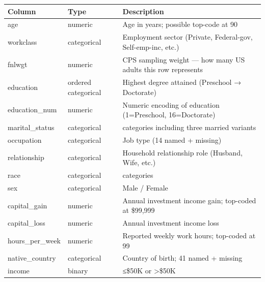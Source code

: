 \documentclass[
  letterpaper,
  DIV=11,
  numbers=noendperiod]{scrartcl}
\begin{document}
\begin{longtable}[]{@{}
  >{\raggedright\arraybackslash}p{}
  >{\raggedright\arraybackslash}p{}
  >{\raggedright\arraybackslash}p{}@{}}
\toprule\noalign{}
\begin{minipage}[b]{\linewidth}\raggedright
Column
\end{minipage} & \begin{minipage}[b]{\linewidth}\raggedright
Type
\end{minipage} & \begin{minipage}[b]{\linewidth}\raggedright
Description
\end{minipage} \\
\midrule\noalign{}
\endhead
\bottomrule\noalign{}
\endlastfoot
age & numeric & Age in years; possible top-code at 90 \\
workclass & categorical & Employment sector (Private, Federal-gov,
Self-emp-inc, etc.) \\
fnlwgt & numeric & CPS sampling weight --- how many US adults this row
represents \\
education & ordered categorical & Highest degree attained (Preschool →
Doctorate) \\
education\_num & numeric & Numeric encoding of education (1=Preschool,
16=Doctorate) \\
marital\_status & categorical & 7 categories including three married
variants \\
occupation & categorical & Job type (14 named + missing) \\
relationship & categorical & Household relationship role (Husband, Wife,
etc.) \\
race & categorical & 5 categories \\
sex & categorical & Male / Female \\
capital\_gain & numeric & Annual investment income gain; top-coded at
\$99,999 \\
capital\_loss & numeric & Annual investment income loss \\
hours\_per\_week & numeric & Reported weekly work hours; top-coded at
99 \\
native\_country & categorical & Country of birth; 41 named + missing \\
income & binary & ≤\$50K or \textgreater\$50K \\
\end{longtable}
\end{document}
